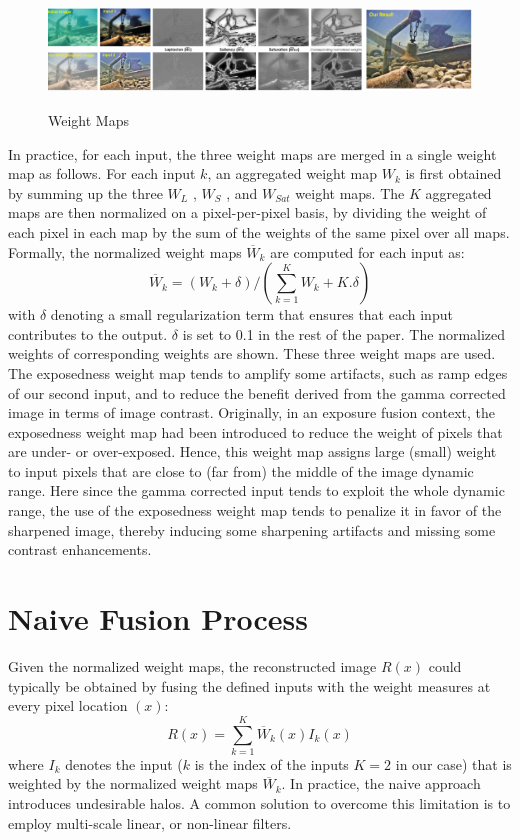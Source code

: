 \documentclass[hidelinks, 12pt]{report}
\begin{document}
\begin{figure}[H]
\centering
\includegraphics[width=15cm,height=3cm]{Weight.png}
\caption[Weight Maps]{Weight Maps}
\label{Weight Maps}
\end{figure}
In practice, for each input, the three weight maps are merged in a single weight map as follows. For each input $k$, an aggregated weight map $W_k$ is first obtained by summing up the three $W_L$ , $W_S$ , and $W_{Sat}$ weight maps. The $K$ aggregated maps are then normalized on a pixel-per-pixel basis, by dividing the weight of each pixel in each map by the sum of the weights of the same pixel over all maps. Formally, the
normalized weight maps $\overline{W}_k$ are computed for each input as:
\begin{equation}
\overline{W}_{k}=(W_k+\delta)/(\sum_{k=1}^{K}W_k + K.\delta)
\end{equation}
with $\delta$ denoting a small regularization term that ensures that each input contributes to the output. $\delta$ is set to 0.1 in the rest of the paper. The normalized weights of corresponding weights are shown. These three weight maps are used. The exposedness weight map tends to amplify some artifacts, such as ramp edges of our second input, and to reduce the benefit derived from the gamma corrected image in terms of image contrast. Originally, in an exposure fusion context, the exposedness weight map had been introduced to reduce the weight of pixels that are under- or over-exposed. Hence, this weight map assigns large (small) weight to input pixels that are close to (far from) the middle of the image dynamic range. Here since the gamma corrected input tends to exploit the whole dynamic range, the use of the exposedness weight map tends to penalize it in favor of the sharpened image, thereby inducing some sharpening artifacts and missing some contrast enhancements.

\section{Naive Fusion Process}
Given the normalized weight maps, the reconstructed image $R(x)$ could typically be obtained by fusing the defined inputs with the weight measures at every pixel location $(x)$:
\begin{equation}
R(x)=\sum_{k=1}^{K}\overline{W}_k(x)I_k(x)
\end{equation}
where $I_k$ denotes the input ($k$ is the index of the inputs $K=2$ in our case) that is weighted by the normalized weight maps $\overline{W}_k$. In practice, the naive approach introduces undesirable halos. A common solution to overcome this limitation is to employ multi-scale linear, or non-linear filters.
\end{document}
